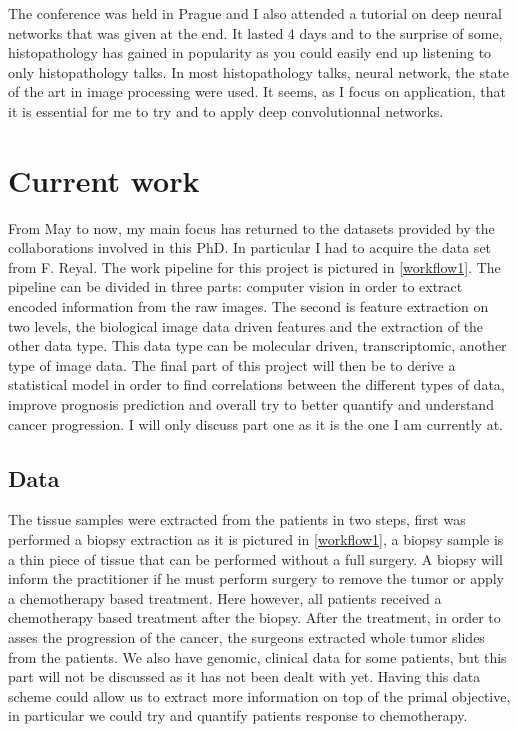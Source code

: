\documentclass[a4paper,10pt]{article}
\begin{document}
The conference was held in Prague and I also attended a tutorial on
deep neural networks that was given at the end. It lasted 4 days and
to the surprise of some, histopathology has gained in popularity as
you could easily end up listening to only histopathology talks. In
most histopathology talks, neural network, the state of the art in
image processing were used. It seems, as I focus on application, that
it is essential for me to try and to apply deep convolutionnal
networks. 


\section{Current work}
From May to now, my main focus has returned to the datasets provided
by the collaborations involved in this PhD. In particular I had to
acquire the data set from F. Reyal. The work pipeline for this project
is pictured in \ref{workflow1}. The pipeline can be divided in three
parts: computer vision in order to extract encoded information from
the raw images. The second is feature extraction on two levels, the
biological image data driven features and the extraction of the other
data type. This data type can be molecular driven, transcriptomic,
another type of image data. The final part of this project will then
be to derive a statistical model in order to find correlations between
the different types of data, improve prognosis prediction and overall
try to better quantify and understand cancer progression. I will only
discuss part one as it is the one I am currently at. 


\subsection{Data}

The tissue samples were extracted from the patients in two steps,
first was performed a biopsy extraction as it is pictured in
\ref{workflow1}, a biopsy sample is a thin piece of tissue that can be
performed without a full surgery. A biopsy will inform the
practitioner if he must perform surgery to remove the tumor or apply a
chemotherapy based treatment. Here however, all patients received a
chemotherapy based treatment after the biopsy. After the treatment, in
order to asses the progression of the cancer, the surgeons extracted
whole tumor slides from the patients. We also have genomic, clinical
data for some patients, but this part will not be discussed as it has
not been dealt with yet. Having this data scheme could allow us to
extract more information on top of the primal objective, in particular
we could try and quantify patients response to chemotherapy. 
\end{document}
